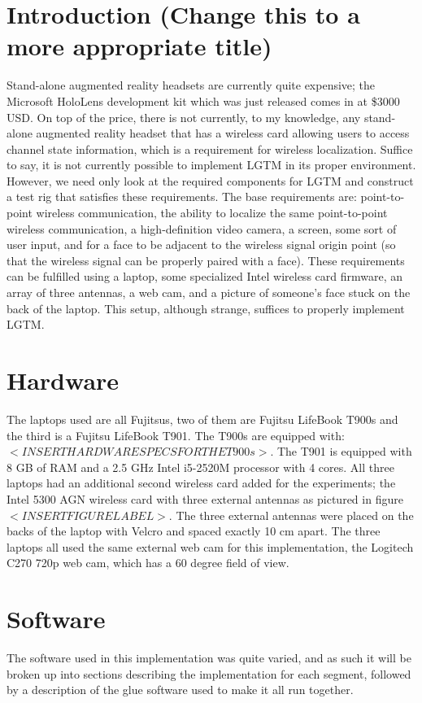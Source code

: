 \documentclass[12pt]{report}
\begin{document}
\section{Introduction (Change this to a more appropriate title)}
Stand-alone augmented reality headsets are currently quite expensive; the Microsoft HoloLens development kit which was just released comes in at \$3000 USD. On top of the price, there is not currently, to my knowledge, any stand-alone augmented reality headset that has a wireless card allowing users to access channel state information, which is a requirement for wireless localization. Suffice to say, it is not currently possible to implement LGTM in its proper environment. However, we need only look at the required components for LGTM and construct a test rig that satisfies these requirements. The base requirements are: point-to-point wireless communication, the ability to localize the same point-to-point wireless communication, a high-definition video camera, a screen, some sort of user input, and for a face to be adjacent to the wireless signal origin point (so that the wireless signal can be properly paired with a face). These requirements can be fulfilled using a laptop, some specialized Intel wireless card firmware, an array of three antennas, a web cam, and a picture of someone's face stuck on the back of the laptop. This setup, although strange, suffices to properly implement LGTM.

\section{Hardware}
The laptops used are all Fujitsus, two of them are Fujitsu LifeBook T900s and the third is a Fujitsu LifeBook T901. The T900s are equipped with: $<INSERT HARDWARE SPECS FOR THE T900s>$. The T901 is equipped with 8 GB of RAM and a 2.5 GHz Intel i5-2520M processor with 4 cores. All three laptops had an additional second wireless card added for the experiments; the Intel 5300 AGN wireless card with three external antennas as pictured in figure $<INSERT FIGURE LABEL>$. The three external antennas were placed on the backs of the laptop with Velcro and spaced exactly 10 cm apart. The three laptops all used the same external web cam for this implementation, the Logitech C270 720p web cam, which has a 60 degree field of view. \\

\section{Software}
The software used in this implementation was quite varied, and as such it will be broken up into sections describing the implementation for each segment, followed by a description of the glue software used to make it all run together. \\
\end{document}
